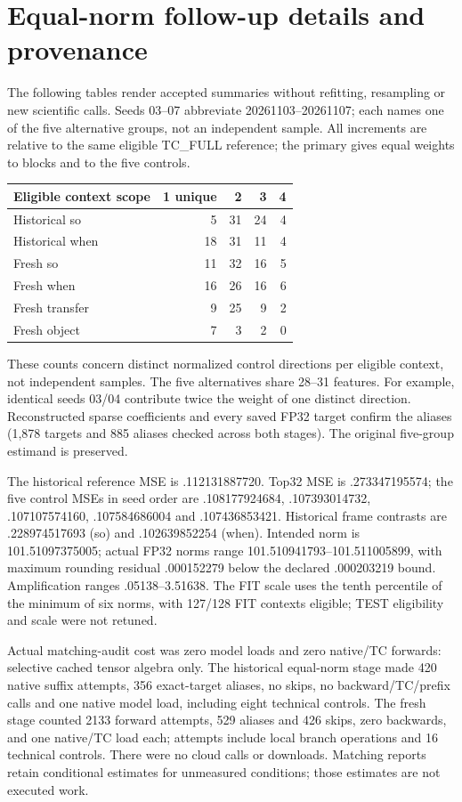 \section{Equal-norm follow-up details and provenance}\label{app:normnew}
The following tables render accepted summaries without refitting, resampling or new scientific calls. Seeds 03--07 abbreviate 20261103--20261107; each names one of the five alternative groups, not an independent sample. All increments are relative to the same eligible TC\_FULL reference; the primary gives equal weights to blocks and to the five controls.
\begin{center}\small
\begin{tabular}{lrrrr}\toprule Eligible context scope & 1 unique & 2 & 3 & 4\\\midrule
Historical so &5&31&24&4\\
Historical when &18&31&11&4\\
Fresh so &11&32&16&5\\
Fresh when &16&26&16&6\\
Fresh transfer &9&25&9&2\\
Fresh object &7&3&2&0\\\bottomrule\end{tabular}\end{center}
These counts concern distinct normalized control directions per eligible context, not independent samples. The five alternatives share 28--31 features. For example, identical seeds 03/04 contribute twice the weight of one distinct direction. Reconstructed sparse coefficients and every saved FP32 target confirm the aliases (1,878 targets and 885 aliases checked across both stages). The original five-group estimand is preserved.
\clearpage

\clearpage
The historical reference MSE is .112131887720. Top32 MSE is .273347195574; the five control MSEs in seed order are .108177924684, .107393014732, .107107574160, .107584686004 and .107436853421. Historical frame contrasts are .228974517693 (so) and .102639852254 (when). Intended norm is 101.51097375005; actual FP32 norms range 101.510941793--101.511005899, with maximum rounding residual .000152279 below the declared .000203219 bound. Amplification ranges .05138--3.51638. The FIT scale uses the tenth percentile of the minimum of six norms, with 127/128 FIT contexts eligible; TEST eligibility and scale were not retuned.

Actual matching-audit cost was zero model loads and zero native/TC forwards: selective cached tensor algebra only. The historical equal-norm stage made 420 native suffix attempts, 356 exact-target aliases, no skips, no backward/TC/prefix calls and one native model load, including eight technical controls. The fresh stage counted 2133 forward attempts, 529 aliases and 426 skips, zero backwards, and one native/TC load each; attempts include local branch operations and 16 technical controls. There were no cloud calls or downloads. Matching reports retain conditional estimates for unmeasured conditions; those estimates are not executed work.

